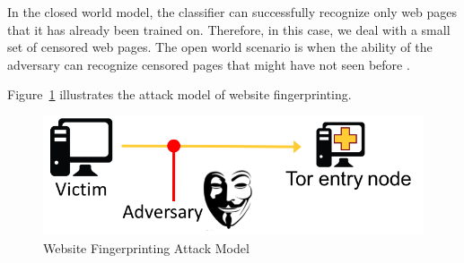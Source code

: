In the closed world model, the classifier can successfully recognize only web pages that it has already been trained on. Therefore, in this case, we deal with a small set of censored web pages. The open world scenario is when the ability of the adversary can recognize censored pages that might have not seen before \cite{TorBlog}.


Figure~\ref{fig:attack} illustrates the attack model of website fingerprinting.

\begin{figure}[h]
\includegraphics[width=0.7\columnwidth]{figures/attack_model.png}
\centering
\caption{Website Fingerprinting Attack Model~\cite{juarez14}}
\label{fig:attack}
\end{figure}

